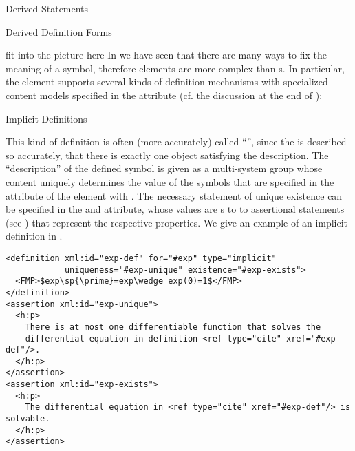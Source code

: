 \begin{omgroup}{Derived Statements}
\begin{module}[id=derived-defs]
\begin{omgroup}[short=Derived Definitions]{Derived Definition Forms}
\begin{oldpart}{fit into the picture here}
In {} we have seen that there are many ways to fix the meaning of a
symbol, therefore {\omdoc} {} elements are more complex than
{s}.  In particular, the {} element supports several
kinds of definition mechanisms with specialized content models specified in the
{} attribute (cf. the discussion at the end of
{}):

\begin{module}[id=implicit-defs]
\begin{omgroup}{Implicit Definitions}

This kind of definition is often (more accurately) called ``{\emph{}}'', since the {} is described so accurately,
that there is exactly one object satisfying the description. The ``description'' of the
defined symbol is given as a multi-system {} group whose content uniquely
determines the value of the symbols that are specified in the
{} attribute of the {} element with
{} {}.  The necessary
statement of unique existence can be specified in the {}
and {} attribute, whose values are
{s} to to assertional statements (see
) that represent the respective properties.  We give
an example of an implicit definition in {}.

\begin{lstlisting}[label=lst:exp-def,mathescape,
  caption={An Implicit Definition of the Exponential Function},
  index={definition,assertion,type,uniqueness,existence}]
<definition xml:id="exp-def" for="#exp" type="implicit" 
            uniqueness="#exp-unique" existence="#exp-exists">
  <FMP>$exp\sp{\prime}=exp\wedge exp(0)=1$</FMP>
</definition>
<assertion xml:id="exp-unique">
  <h:p>
    There is at most one differentiable function that solves the 
    differential equation in definition <ref type="cite" xref="#exp-def"/>.
  </h:p>
</assertion>
<assertion xml:id="exp-exists">
  <h:p>
    The differential equation in <ref type="cite" xref="#exp-def"/> is solvable.
  </h:p>
</assertion>
\end{lstlisting}
\end{omgroup}
\end{module}


\end{oldpart}
\end{omgroup}
\end{module}
\end{omgroup}
